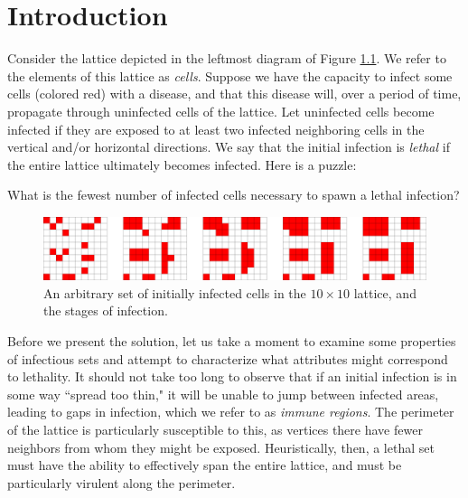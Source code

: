 \chapter{Introduction}

Consider the lattice depicted in the leftmost diagram of Figure \ref{fig:simple_puzzle}. We refer to the elements of this lattice as \emph{cells}. Suppose we have the capacity to infect some cells (colored red) with a disease, and that this disease will, over a period of time, propagate through uninfected cells of the lattice. Let uninfected cells become infected if they are exposed to at least two infected neighboring cells in the vertical and/or horizontal directions. We say that the initial infection is \emph{lethal} if the entire lattice ultimately becomes infected. Here is a puzzle:

\begin{question}
\label{que:simple_puzzle}
What is the fewest number of infected cells necessary to spawn a lethal infection?
\end{question}

\begin{figure}[]
\centering
\includegraphics[width=\textwidth]{figures/1/simple_puzzle.pdf}
\caption{An arbitrary set of initially infected cells in the $10 \times 10$ lattice, and the stages of infection.}
\label{fig:simple_puzzle}
\end{figure} 

Before we present the solution,
let us take a moment to examine some properties of infectious sets and attempt to characterize what attributes might correspond to lethality. It should not take too long to observe that if an initial infection is in some way ``spread too thin," it will be unable to jump between infected areas, leading to gaps in infection, which we refer to as \emph{immune regions}. The perimeter of the lattice is particularly susceptible to this, as vertices there have fewer neighbors from whom they might be exposed. Heuristically, then, a lethal set must have the ability to effectively span the entire lattice, and must be particularly virulent along the perimeter. 

